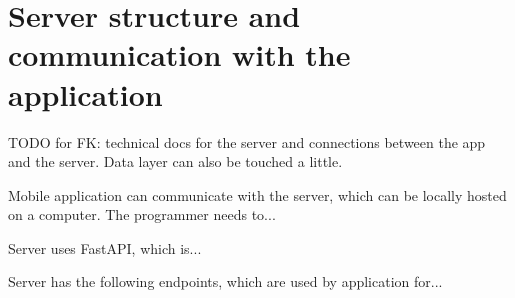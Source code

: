 
\section{Server structure and communication with the application}

TODO for FK: technical docs for the server and connections between the app and the server. Data layer can also be touched a little.

Mobile application can communicate with the server, which can be locally hosted on a computer. The programmer needs to...

Server uses FastAPI, which is...

Server has the following endpoints, which are used by application for...